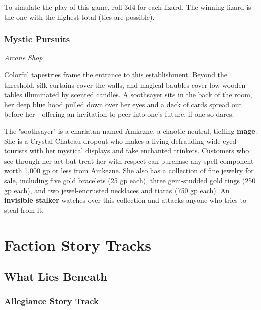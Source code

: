 \documentclass[a4paper, 11pt, bg=full, twocolumn, nooutline]{dndbook}
\begin{document}
To simulate the play of this game, roll 3d4 for each lizard. The winning lizard is the one with the highest total (ties are possible).

\subsubsection{Mystic Pursuits}

\textit{Arcane Shop}

Colorful tapestries frame the entrance to this establishment. Beyond the threshold, silk curtains cover the walls, and magical baubles cover low wooden tables illuminated by scented candles. A soothsayer sits in the back of the room, her deep blue hood pulled down over her eyes and a deck of cards spread out before her---offering an invitation to peer into one's future, if one so dares.

The "soothsayer" is a charlatan named Amkezne, a chaotic neutral, tiefling \textbf{mage}. She is a Crystal Chateau dropout who makes a living defrauding wide-eyed tourists with her mystical displays and fake enchanted trinkets. Customers who see through her act but treat her with respect can purchase any spell component worth 1,000 gp or less from Amkezne. She also has a collection of fine jewelry for sale, including five gold bracelets (25 gp each), three gem-studded gold rings (250 gp each), and two jewel-encrusted necklaces and tiaras (750 gp each). An \textbf{invisible stalker} watches over this collection and attacks anyone who tries to steal from it.

\section{Faction Story Tracks}


\subsection{What Lies Beneath}

\subsubsection{Allegiance Story Track}
\end{document}
